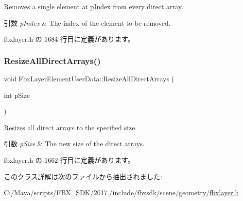 Removes a single element at p\+Index from every direct array. 
\begin{DoxyParams}{引数}
{\em p\+Index} & The index of the element to be removed. \\
\hline
\end{DoxyParams}


 fbxlayer.\+h の 1684 行目に定義があります。

\mbox{\label{class_fbx_layer_element_user_data_a8d6ab3a926c28cc793dbfabde35ab598}} 
\subsubsection{\texorpdfstring{Resize\+All\+Direct\+Arrays()}{ResizeAllDirectArrays()}}
{\footnotesize\ttfamily void Fbx\+Layer\+Element\+User\+Data\+::\+Resize\+All\+Direct\+Arrays (\begin{DoxyParamCaption}\item[{int}]{p\+Size }\end{DoxyParamCaption})\hspace{0.3cm}{\ttfamily [inline]}}

Resizes all direct arrays to the specified size. 
\begin{DoxyParams}{引数}
{\em p\+Size} & The new size of the direct arrays. \\
\hline
\end{DoxyParams}


 fbxlayer.\+h の 1662 行目に定義があります。



このクラス詳解は次のファイルから抽出されました\+:\begin{DoxyCompactItemize}
\item 
C\+:/\+Maya/scripts/\+F\+B\+X\+\_\+\+S\+D\+K/2017./include/fbxsdk/scene/geometry/\hyperlink{fbxlayer_8h}{fbxlayer.\+h}\end{DoxyCompactItemize}
